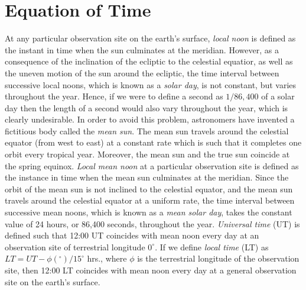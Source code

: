 \section{Equation of Time}
At any particular observation site on the earth's surface, {\em local noon}\/
is defined as the instant in time when the sun culminates at the
meridian. However, as a consequence of the inclination of the
ecliptic to the celestial equatior, as well as the uneven motion of the
sun around the ecliptic, the time interval  between successive local noons, which
is known as a {\em solar day}, 
is not constant, but varies throughout the year. Hence, if we were to
define a second as $1/86,400$ of a solar day then the length of a second
would also vary throughout the year, which is clearly undesirable. In
order to avoid this problem, astronomers have invented a fictitious
body called the {\em mean sun}. The mean sun travels around the
celestial equator (from west to east) at a constant
rate which is such that it completes one orbit every tropical year. Moreover,
the mean sun and the true sun coincide at the spring equinox. {\em Local mean noon}\/ at a particular observation
site is defined as the instance in time when the mean sun culminates at
the meridian. Since the orbit of the mean sun is not inclined to the
celestial equator, and the mean sun travels  around the celestial equator at a uniform rate, the time
interval between successive mean noons, which is known as a
{\em mean solar day}, takes the constant value of 24 hours, or
86,400 seconds, throughout the year. {\em Universal time}\/ (UT)
is defined such that 12:00  UT coincides with mean noon every day at
an observation site of terrestrial longitude $0^\circ$. If we define {\em local  time}\/
(LT)
as $LT = UT- \phi(^\circ)/15^\circ$ hrs., where $\phi$ is the terrestrial longitude
of the observation site, then 12:00  LT coincides with mean noon
every day at a general observation site on the earth's surface.

